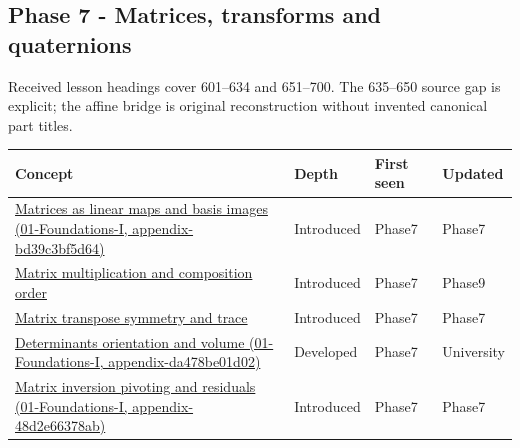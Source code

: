 \subsection{Phase 7 - Matrices, transforms and quaternions}\label{appendix-a6d556a4ef50-phase-7---matrices-transforms-and-quaternions}

Received lesson headings cover 601--634 and 651--700. The 635--650 source gap is explicit; the affine bridge is original reconstruction without invented canonical part titles.

{\def\LTcaptype{none} %
\begin{longtable}[]{@{}
  >{\raggedright\arraybackslash}p{}
  >{\raggedright\arraybackslash}p{}
  >{\raggedright\arraybackslash}p{}
  >{\raggedright\arraybackslash}p{}@{}}
\toprule\noalign{}
\begin{minipage}[b]{\linewidth}\raggedright
Concept
\end{minipage} & \begin{minipage}[b]{\linewidth}\raggedright
Depth
\end{minipage} & \begin{minipage}[b]{\linewidth}\raggedright
First seen
\end{minipage} & \begin{minipage}[b]{\linewidth}\raggedright
Updated
\end{minipage} \\
\midrule\noalign{}
\endhead
\bottomrule\noalign{}
\endlastfoot
\href{../01-Foundations-I/main.pdf\#nameddest=appendix-bd39c3bf5d64}{Matrices as linear maps and basis images (01-Foundations-I, appendix-bd39c3bf5d64)} & Introduced & Phase7 & Phase7 \\
\hyperref[appendix-ab31ef447dbf]{Matrix multiplication and composition order} & Introduced & Phase7 & Phase9 \\
\hyperref[appendix-175ca5ff874d]{Matrix transpose symmetry and trace} & Introduced & Phase7 & Phase7 \\
\href{../01-Foundations-I/main.pdf\#nameddest=appendix-da478be01d02}{Determinants orientation and volume (01-Foundations-I, appendix-da478be01d02)} & Developed & Phase7 & University \\
\href{../01-Foundations-I/main.pdf\#nameddest=appendix-48d2e66378ab}{Matrix inversion pivoting and residuals (01-Foundations-I, appendix-48d2e66378ab)} & Introduced & Phase7 & Phase7 \\

\end{longtable}}
